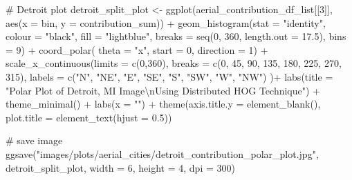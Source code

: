 \documentclass[
  letterpaper,
  DIV=11,
  numbers=noendperiod]{scrreprt}
\newenvironment{Shaded}{\begin{snugshade}}{\end{snugshade}}
\newcommand{\AttributeTok}[1]{\textcolor[rgb]{0.40,0.45,0.13}{#1}}
\newcommand{\CommentTok}[1]{\textcolor[rgb]{0.37,0.37,0.37}{#1}}
\newcommand{\DecValTok}[1]{\textcolor[rgb]{0.68,0.00,0.00}{#1}}
\newcommand{\FloatTok}[1]{\textcolor[rgb]{0.68,0.00,0.00}{#1}}
\newcommand{\FunctionTok}[1]{\textcolor[rgb]{0.28,0.35,0.67}{#1}}
\newcommand{\NormalTok}[1]{\textcolor[rgb]{0.00,0.23,0.31}{#1}}
\newcommand{\OtherTok}[1]{\textcolor[rgb]{0.00,0.23,0.31}{#1}}
\newcommand{\SpecialCharTok}[1]{\textcolor[rgb]{0.37,0.37,0.37}{#1}}
\newcommand{\StringTok}[1]{\textcolor[rgb]{0.13,0.47,0.30}{#1}}
\begin{document}
\begin{Shaded}
\begin{Highlighting}[]
\CommentTok{\# Detroit plot}
\NormalTok{detroit\_split\_plot }\OtherTok{\textless{}{-}}
  \FunctionTok{ggplot}\NormalTok{(aerial\_contribution\_df\_list[[}\DecValTok{3}\NormalTok{]], }
         \FunctionTok{aes}\NormalTok{(}\AttributeTok{x =}\NormalTok{ bin, }\AttributeTok{y =}\NormalTok{ contribution\_sum)) }\SpecialCharTok{+}
  \FunctionTok{geom\_histogram}\NormalTok{(}\AttributeTok{stat =} \StringTok{"identity"}\NormalTok{,}
                 \AttributeTok{colour =} \StringTok{"black"}\NormalTok{, }
                 \AttributeTok{fill =} \StringTok{"lightblue"}\NormalTok{, }
                 \AttributeTok{breaks =} \FunctionTok{seq}\NormalTok{(}\DecValTok{0}\NormalTok{, }\DecValTok{360}\NormalTok{, }\AttributeTok{length.out =} \FloatTok{17.5}\NormalTok{),}
                 \AttributeTok{bins =} \DecValTok{9}\NormalTok{) }\SpecialCharTok{+}
  \FunctionTok{coord\_polar}\NormalTok{(}
    \AttributeTok{theta =} \StringTok{"x"}\NormalTok{, }
    \AttributeTok{start =} \DecValTok{0}\NormalTok{, }
    \AttributeTok{direction =} \DecValTok{1}\NormalTok{) }\SpecialCharTok{+}
  \FunctionTok{scale\_x\_continuous}\NormalTok{(}\AttributeTok{limits =} \FunctionTok{c}\NormalTok{(}\DecValTok{0}\NormalTok{,}\DecValTok{360}\NormalTok{),}
    \AttributeTok{breaks =} \FunctionTok{c}\NormalTok{(}\DecValTok{0}\NormalTok{, }\DecValTok{45}\NormalTok{, }\DecValTok{90}\NormalTok{, }\DecValTok{135}\NormalTok{, }\DecValTok{180}\NormalTok{, }\DecValTok{225}\NormalTok{, }\DecValTok{270}\NormalTok{, }\DecValTok{315}\NormalTok{), }
    \AttributeTok{labels =} \FunctionTok{c}\NormalTok{(}\StringTok{"N"}\NormalTok{, }\StringTok{"NE"}\NormalTok{, }\StringTok{"E"}\NormalTok{, }\StringTok{"SE"}\NormalTok{, }\StringTok{"S"}\NormalTok{, }\StringTok{"SW"}\NormalTok{, }\StringTok{"W"}\NormalTok{, }\StringTok{"NW"}\NormalTok{)}
\NormalTok{  )}\SpecialCharTok{+}
  \FunctionTok{labs}\NormalTok{(}\AttributeTok{title =} \StringTok{"Polar Plot of Detroit, MI Image}\SpecialCharTok{\textbackslash{}n}\StringTok{Using Distributed HOG Technique"}\NormalTok{) }\SpecialCharTok{+}
  \FunctionTok{theme\_minimal}\NormalTok{() }\SpecialCharTok{+}
  \FunctionTok{labs}\NormalTok{(}\AttributeTok{x =} \StringTok{""}\NormalTok{) }\SpecialCharTok{+}
  \FunctionTok{theme}\NormalTok{(}\AttributeTok{axis.title.y =} \FunctionTok{element\_blank}\NormalTok{(),}
        \AttributeTok{plot.title =} \FunctionTok{element\_text}\NormalTok{(}\AttributeTok{hjust =} \FloatTok{0.5}\NormalTok{))}

\CommentTok{\# save image}
\FunctionTok{ggsave}\NormalTok{(}\StringTok{"images/plots/aerial\_cities/detroit\_contribution\_polar\_plot.jpg"}\NormalTok{, detroit\_split\_plot, }\AttributeTok{width =} \DecValTok{6}\NormalTok{, }\AttributeTok{height =} \DecValTok{4}\NormalTok{, }\AttributeTok{dpi =} \DecValTok{300}\NormalTok{)}
\end{Highlighting}
\end{Shaded}
\end{document}
